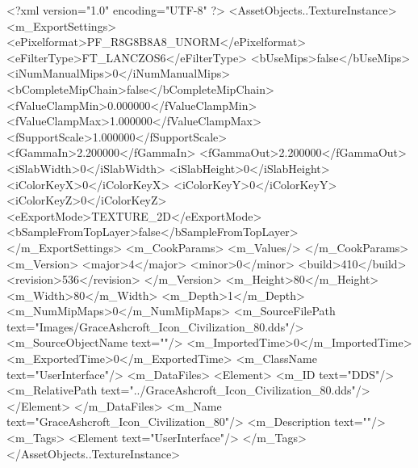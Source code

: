 <?xml version="1.0" encoding="UTF-8" ?>
<AssetObjects..TextureInstance>
	<m_ExportSettings>
		<ePixelformat>PF_R8G8B8A8_UNORM</ePixelformat>
		<eFilterType>FT_LANCZOS6</eFilterType>
		<bUseMips>false</bUseMips>
		<iNumManualMips>0</iNumManualMips>
		<bCompleteMipChain>false</bCompleteMipChain>
		<fValueClampMin>0.000000</fValueClampMin>
		<fValueClampMax>1.000000</fValueClampMax>
		<fSupportScale>1.000000</fSupportScale>
		<fGammaIn>2.200000</fGammaIn>
		<fGammaOut>2.200000</fGammaOut>
		<iSlabWidth>0</iSlabWidth>
		<iSlabHeight>0</iSlabHeight>
		<iColorKeyX>0</iColorKeyX>
		<iColorKeyY>0</iColorKeyY>
		<iColorKeyZ>0</iColorKeyZ>
		<eExportMode>TEXTURE_2D</eExportMode>
		<bSampleFromTopLayer>false</bSampleFromTopLayer>
	</m_ExportSettings>
	<m_CookParams>
		<m_Values/>
	</m_CookParams>
	<m_Version>
		<major>4</major>
		<minor>0</minor>
		<build>410</build>
		<revision>536</revision>
	</m_Version>
	<m_Height>80</m_Height>
	<m_Width>80</m_Width>
	<m_Depth>1</m_Depth>
	<m_NumMipMaps>0</m_NumMipMaps>
	<m_SourceFilePath text="Images/GraceAshcroft_Icon_Civilization_80.dds"/>
	<m_SourceObjectName text=""/>
	<m_ImportedTime>0</m_ImportedTime>
	<m_ExportedTime>0</m_ExportedTime>
	<m_ClassName text="UserInterface"/>
	<m_DataFiles>
		<Element>
			<m_ID text="DDS"/>
			<m_RelativePath text="../GraceAshcroft_Icon_Civilization_80.dds"/>
		</Element>
	</m_DataFiles>
	<m_Name text="GraceAshcroft_Icon_Civilization_80"/>
	<m_Description text=""/>
	<m_Tags>
		<Element text="UserInterface"/>
	</m_Tags>
</AssetObjects..TextureInstance>
